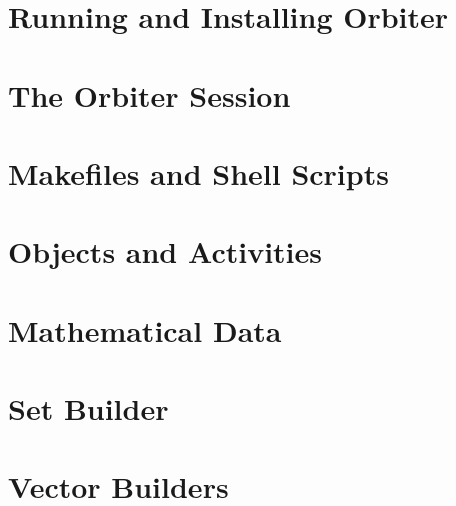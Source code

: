 \section{Running and Installing Orbiter}






\bigskip

\clearpage



\section{The Orbiter Session}
\label{sec:session}





\clearpage

\section{Makefiles and Shell Scripts}
\label{sec:makefiles}





\clearpage

\section{Objects and Activities}
\label{sec:objects:activities}





\clearpage



\section{Mathematical Data}
\label{sec:mathematical:data}





\clearpage



\section{Set Builder}
\label{sec:set:builder}





\clearpage





\section{Vector Builders}
\label{sec:vector:builder}

